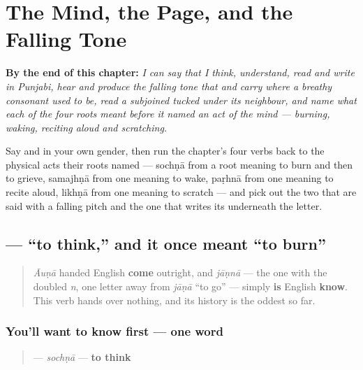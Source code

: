 
\chapter{The Mind, the Page, and the Falling Tone}
\label{ch:pa-mind-and-tone}

\begin{chapteropening}
\textbf{By the end of this chapter:} \emph{I can say that I think, understand, read and write in Punjabi, hear and produce the falling tone that  and  carry where a breathy consonant used to be, read a subjoined  tucked under its neighbour, and name what each of the four roots meant before it named an act of the mind — burning, waking, reciting aloud and scratching.}

Say     and     in your own gender, then run the chapter's four verbs back to the physical acts their roots named — sochṇā from a root meaning to burn and then to grieve, samajhṇā from one meaning to wake, paṛhnā from one meaning to recite aloud, likhṇā from one meaning to scratch — and pick out the two that are said with a falling pitch and the one that writes its  underneath the letter.
\end{chapteropening}

\section[\texorpdfstring{\pa{ਸੋਚਣਾ} (sochṇā)}{ਸੋਚਣਾ (sochṇā)}]{ — “to think,” and it once meant “to burn”}

\label{lesson:PA-C08-sochna}



\begin{quote}
\emph{Āuṇā} handed English \textbf{come} outright, and \emph{jāṇnā} — the one with the doubled \emph{n}, one letter away from \emph{jāṇā} “to go” — simply \textbf{is} English \textbf{know}. This verb hands over nothing, and its history is the oddest so far.
\end{quote}

\subsection*{You'll want to know first — one word}
\begin{quote}
\textbf{} — \emph{sochṇā} — \textbf{to think}
\end{quote}

